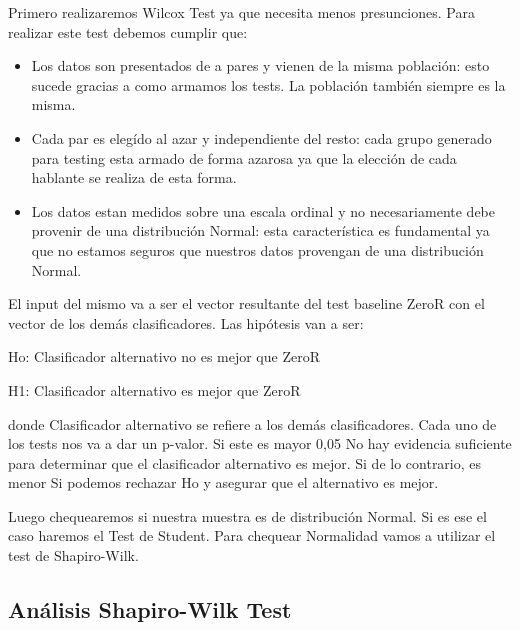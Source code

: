 \documentclass[11pt,a4paper,twoside]{tesis}
\begin{document}
Primero realizaremos Wilcox Test ya que necesita menos presunciones. Para realizar este test debemos cumplir que:

\begin{itemize}
    \item Los datos son presentados de a pares y vienen de la misma población: esto sucede gracias a como armamos los tests. La población también siempre es la misma.
    \item Cada par es elegído al azar y independiente del resto: cada grupo generado para testing esta armado de forma azarosa ya que la elección de cada hablante se realiza de esta forma.
    \item Los datos estan medidos sobre una escala ordinal y no necesariamente debe provenir de una distribución Normal: esta característica es fundamental ya que no estamos seguros que nuestros datos provengan de una distribución Normal.
\end{itemize}

El input del mismo va a ser el vector resultante del test baseline ZeroR con el vector de los demás clasificadores. Las hipótesis van a ser:

\vspace{0.5cm}
\hspace{2cm}Ho: Clasificador alternativo no es mejor que ZeroR
\vspace{0.25cm}

\hspace{2cm}H1: Clasificador alternativo es mejor que ZeroR
\vspace{0.5cm}

donde Clasificador alternativo se refiere a los demás clasificadores. 
Cada uno de los tests nos va a dar un p-valor.
Si este es mayor 0,05 No hay evidencia suficiente para determinar que el clasificador alternativo es mejor.
Si de lo contrario, es menor Si podemos rechazar Ho y asegurar que el alternativo es mejor. 

Luego chequearemos si nuestra muestra es de distribución Normal. Si es ese el caso haremos el Test de Student. Para chequear Normalidad vamos a utilizar el test de Shapiro-Wilk.

\subsection{Análisis Shapiro-Wilk Test}
\end{document}
